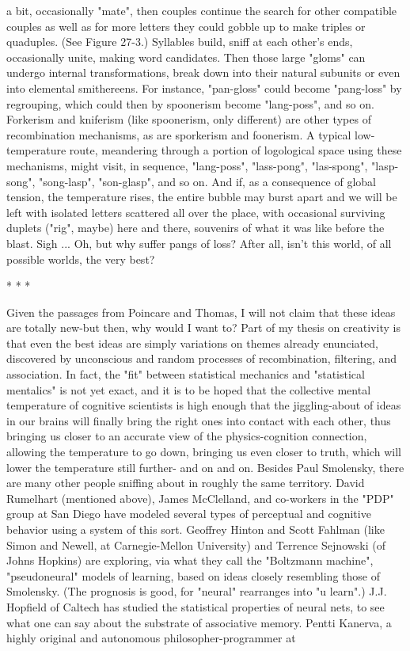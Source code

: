a bit, occasionally "mate", then couples continue the search for other compatible
couples as well as for more letters they could gobble up to make triples or quaduples.
(See Figure 27-3.) Syllables build, sniff at each other's ends, occasionally unite,
making word candidates. Then those large "gloms" can undergo internal
transformations, break down into their natural subunits or even into elemental
smithereens. For instance, "pan-gloss" could become "pang-loss" by regrouping,
which could then by spoonerism become "lang-poss", and so on. Forkerism and
kniferism (like spoonerism, only different) are other types of recombination
mechanisms, as are sporkerism and foonerism. A typical low-temperature route,
meandering through a portion of logological space using these mechanisms, might
visit, in sequence, "lang-poss", "lass-pong", "las-spong", "lasp-song", "song-lasp",
"son-glasp", and so on. And if, as a consequence of global tension, the temperature
rises, the entire bubble may burst apart and we will be left with isolated letters
scattered all over the place, with occasional surviving duplets ("rig", maybe) here and
there, souvenirs of what it was like before the blast. Sigh ... Oh, but why suffer pangs
of loss? After all, isn't this world, of all possible worlds, the very best?

                                       *   *   *

        Given the passages from Poincare and Thomas, I will not claim that these
ideas are totally new-but then, why would I want to? Part of my thesis on creativity is
that even the best ideas are simply variations on themes already enunciated,
discovered by unconscious and random processes of recombination, filtering, and
association. In fact, the "fit" between statistical mechanics and "statistical mentalics"
is not yet exact, and it is to be hoped that the collective mental temperature of
cognitive scientists is high enough that the jiggling-about of ideas in our brains will
finally bring the right ones into contact with each other, thus bringing us closer to an
accurate view of the physics-cognition connection, allowing the temperature to go
down, bringing us even closer to truth, which will lower the temperature still further-
and on and on.
        Besides Paul Smolensky, there are many other people sniffing about in
roughly the same territory. David Rumelhart (mentioned above), James McClelland,
and co-workers in the "PDP" group at San Diego have modeled several types of
perceptual and cognitive behavior using a system of this sort. Geoffrey Hinton and
Scott Fahlman (like Simon and Newell, at Carnegie-Mellon University) and Terrence
Sejnowski (of Johns Hopkins) are exploring, via what they call the "Boltzmann
machine", "pseudoneural" models of learning, based on ideas closely resembling
those of Smolensky. (The prognosis is good, for "neural" rearranges into "u learn".)
J.J. Hopfield of Caltech has studied the statistical properties of neural nets, to see
what one can say about the substrate of associative memory. Pentti Kanerva, a highly
original and autonomous philosopher-programmer at




